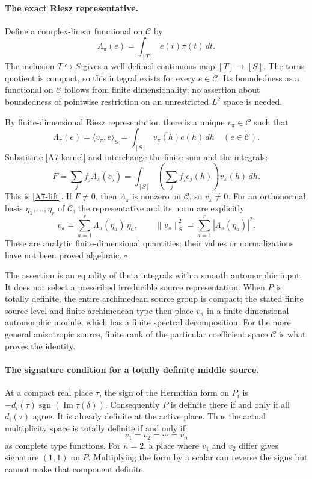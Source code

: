 \documentclass[11pt]{article}
\theoremstyle{definition}\newtheorem{definition}[theorem]{Definition}\newtheorem{remark}[theorem]{Remark}
\begin{document}
\paragraph{The exact Riesz representative.}
Define a complex-linear functional on $\mathcal C$ by
\[
 \Lambda_\pi(e)=\int_{[T]}e(t)\pi(t)\,dt.
\]
The inclusion $T\hookrightarrow S$ gives a well-defined continuous
map $[T]\to[S]$. The torus quotient is compact, so this integral
exists for every $e\in\mathcal C$. Its boundedness as a functional
on $\mathcal C$ follows from finite dimensionality; no assertion
about boundedness of pointwise restriction on an unrestricted
$L^2$ space is needed.

By finite-dimensional Riesz representation there is a unique
$v_\pi\in\mathcal C$ such that
\[
 \Lambda_\pi(e)=\langle v_\pi,e\rangle_S
               =\int_{[S]}\overline{v_\pi(h)}e(h)\,dh
 \quad(e\in\mathcal C).
\]
Substitute \eqref{A7-kernel} and interchange the finite sum and
the integrals:
\[
 F=\sum_jf_j\Lambda_\pi(e_j)
   =\int_{[S]}\left(\sum_jf_je_j(h)\right)
                                  \overline{v_\pi(h)}\,dh.
\]
This is \eqref{A7-lift}. If $F\ne0$, then
$\Lambda_\pi$ is nonzero on $\mathcal C$, so $v_\pi\ne0$.
For an orthonormal basis $\eta_1,\ldots,\eta_r$ of $\mathcal C$,
the representative and its norm are explicitly
\[
 v_\pi=\sum_{a=1}^r
              \overline{\Lambda_\pi(\eta_a)}\,\eta_a,
 \qquad
 \|v_\pi\|_S^2=\sum_{a=1}^r|\Lambda_\pi(\eta_a)|^2.
\]
These are analytic finite-dimensional quantities; their values
or normalizations have not been proved algebraic.
\hfill$\square$

The assertion is an equality of theta integrals with a smooth
automorphic input. It does not select a prescribed irreducible
source representation. When $P$ is totally definite, the entire
archimedean source group is compact; the stated finite source
level and finite archimedean type then place $v_\pi$ in a
finite-dimensional automorphic module, which has a finite
spectral decomposition. For the more general anisotropic source,
finite rank of the particular coefficient space $\mathcal C$
is what proves the identity.

\paragraph{The signature condition for a totally definite middle source.}
At a compact real place $\tau$, the sign of the Hermitian form on
$P_i$ is
$-d_i(\tau)\operatorname{sgn}(\operatorname{Im}\tau(\delta))$.
Consequently $P$ is definite there if and only if all
$d_i(\tau)$ agree. It is already definite at the active place.
Thus the actual multiplicity space is totally definite if and
only if
\[
 v_1=v_2=\cdots=v_n
\]
as complete type functions. For $n=2$, a place where $v_1$
and $v_2$ differ gives signature $(1,1)$ on $P$. Multiplying
the form by a scalar can reverse the signs but cannot make that
component definite.
\end{document}
